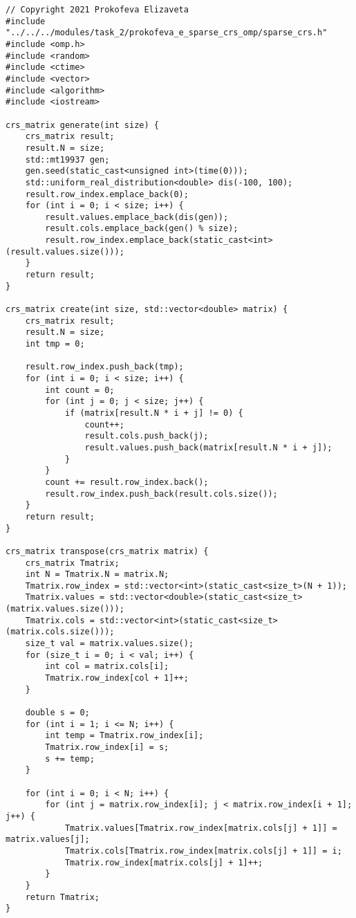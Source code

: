 \documentclass{report}
\begin{document}
\begin{lstlisting}
// Copyright 2021 Prokofeva Elizaveta
#include "../../../modules/task_2/prokofeva_e_sparse_crs_omp/sparse_crs.h"
#include <omp.h>
#include <random>
#include <ctime>
#include <vector>
#include <algorithm>
#include <iostream>

crs_matrix generate(int size) {
    crs_matrix result;
    result.N = size;
    std::mt19937 gen;
    gen.seed(static_cast<unsigned int>(time(0)));
    std::uniform_real_distribution<double> dis(-100, 100);
    result.row_index.emplace_back(0);
    for (int i = 0; i < size; i++) {
        result.values.emplace_back(dis(gen));
        result.cols.emplace_back(gen() % size);
        result.row_index.emplace_back(static_cast<int>(result.values.size()));
    }
    return result;
}

crs_matrix create(int size, std::vector<double> matrix) {
    crs_matrix result;
    result.N = size;
    int tmp = 0;

    result.row_index.push_back(tmp);
    for (int i = 0; i < size; i++) {
        int count = 0;
        for (int j = 0; j < size; j++) {
            if (matrix[result.N * i + j] != 0) {
                count++;
                result.cols.push_back(j);
                result.values.push_back(matrix[result.N * i + j]);
            }
        }
        count += result.row_index.back();
        result.row_index.push_back(result.cols.size());
    }
    return result;
}

crs_matrix transpose(crs_matrix matrix) {
    crs_matrix Tmatrix;
    int N = Tmatrix.N = matrix.N;
    Tmatrix.row_index = std::vector<int>(static_cast<size_t>(N + 1));
    Tmatrix.values = std::vector<double>(static_cast<size_t>(matrix.values.size()));
    Tmatrix.cols = std::vector<int>(static_cast<size_t>(matrix.cols.size()));
    size_t val = matrix.values.size();
    for (size_t i = 0; i < val; i++) {
        int col = matrix.cols[i];
        Tmatrix.row_index[col + 1]++;
    }

    double s = 0;
    for (int i = 1; i <= N; i++) {
        int temp = Tmatrix.row_index[i];
        Tmatrix.row_index[i] = s;
        s += temp;
    }

    for (int i = 0; i < N; i++) {
        for (int j = matrix.row_index[i]; j < matrix.row_index[i + 1]; j++) {
            Tmatrix.values[Tmatrix.row_index[matrix.cols[j] + 1]] = matrix.values[j];
            Tmatrix.cols[Tmatrix.row_index[matrix.cols[j] + 1]] = i;
            Tmatrix.row_index[matrix.cols[j] + 1]++;
        }
    }
    return Tmatrix;
}


\end{lstlisting}
\end{document}
